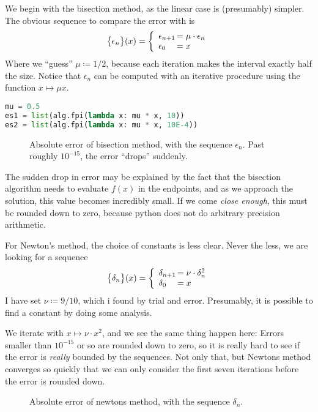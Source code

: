 \documentclass[12pt]{article}
\begin{document}
\begin{multicols}{2}
We begin with the bisection method, as the linear case is (presumably)
simpler.
The obvious sequence to compare the error with is
\[
    \Seq{\epsilon_n}(x) = \left\{\begin{array}{l@{\,}l}
        \epsilon_{n+1} & = \mu \cdot \epsilon_n \\
        \epsilon_0 & = x
    \end{array}\right.
\]
Where we ``guess'' $\mu \coloneqq 1/2$, because each iteration
makes the interval exactly half the size.
Notice that $\epsilon_n$ can be computed
with an iterative procedure using the function $x \mapsto \mu x$.
\begin{lstlisting}[language=Python, caption={Computing the sequences}]
mu = 0.5
es1 = list(alg.fpi(lambda x: mu * x, 10))
es2 = list(alg.fpi(lambda x: mu * x, 10E-4))
\end{lstlisting}
\begin{figure}[H]
\centering

\caption{
    Absolute error of bisection method, with the
    sequence $\epsilon_n$.
    Past roughly $10^{-15}$, the error ``drops'' suddenly.
}
\end{figure} \noindent
The sudden drop in error may be explained by
the fact that the bisection algorithm needs to
evaluate $f(x)$ in the endpoints, and
as we approach the solution, this value becomes
incredibly small.
If we come {\em close enough}, this must be rounded down
to zero, because python does not do arbitrary precision
arithmetic.

For Newton's method, the choice of constants is less clear.
Never the less, we are looking for a sequence
\[
    \Seq{\delta_n}(x) = \left\{\begin{array}{l@{\,}l}
        \delta_{n+1} & = \nu \cdot \delta_n^2 \\
        \delta_0 & = x
    \end{array}\right.
\]
I have set $\nu \coloneqq 9/10$, which i found by trial and error.
Presumably, it is possible to find a constant by doing
some analysis.

We iterate with $x \mapsto \nu \cdot x^2$,
and we see the same thing happen here: Errors smaller than $10^{-15}$
or so are rounded down to zero, so it is really hard to see
if the error is {\em really} bounded by the sequences.
Not only that, but Newtons method converges so quickly that
we can only consider the first seven iterations before the error is
rounded down.


\begin{figure}[H]
\centering

\caption{
    Absolute error of newtons method,
    with the sequence $\delta_n$.
}
\end{figure}

\end{multicols}
\end{document}
